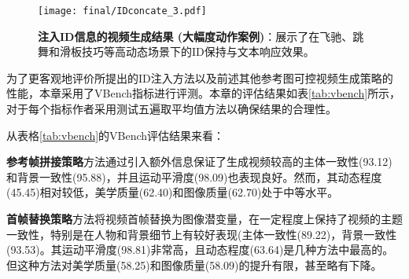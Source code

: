 \begin{figure}[htbp]
    \centering
    \texttt{[image: final/IDconcate\_3.pdf]}
    \caption{\textbf{注入ID信息的视频生成结果 (大幅度动作案例)}：展示了在飞驰、跳舞和滑板技巧等高动态场景下的ID保持与文本响应效果。}
    \label{IDconcate_3}
\end{figure}

为了更客观地评价所提出的ID注入方法以及前述其他参考图可控视频生成策略的性能，本章采用了VBench\cite{huang2023vbench,huang2024vbench++,zheng2025vbench2}指标进行评测。本章的评估结果如表\ref{tab:vbench}所示，对于每个指标作者采用测试五遍取平均值方法以确保结果的合理性。

\begin{table*}[t]
\centering
\caption{不同方法在VBench各项指标上的表现对比}
\scriptsize
\setlength{\tabcolsep}{2pt}
\renewcommand{\arraystretch}{1.0}
\vspace{-0.1in}
\label{tab:vbench}
\end{table*}

从表格\ref{tab:vbench}的VBench评估结果来看：

\textbf{参考帧拼接策略}方法通过引入额外信息保证了生成视频较高的主体一致性(93.12)和背景一致性(95.88)，并且运动平滑度(98.09)也表现良好。然而，其动态程度(45.45)相对较低，美学质量(62.40)和图像质量(62.70)处于中等水平。

\textbf{首帧替换策略}方法将视频首帧替换为图像潜变量，在一定程度上保持了视频的主题一致性，特别是在人物和背景细节上有较好表现(主体一致性(89.22)，背景一致性(93.53)。其运动平滑度(98.81)非常高，且动态程度(63.64)是几种方法中最高的。但这种方法对美学质量(58.25)和图像质量(58.09)的提升有限，甚至略有下降。

